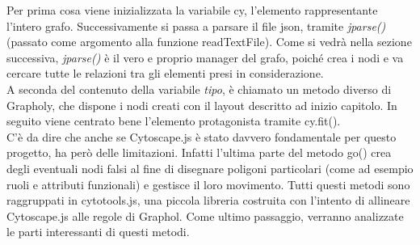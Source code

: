 \documentclass[Lau,binding=0.6cm]{sapthesis}
\begin{document}
Per prima cosa viene inizializzata la variabile cy, l'elemento rappresentante l'intero grafo. Successivamente si passa a parsare il file json, tramite \textit{jparse()} (passato come argomento alla funzione readTextFile). Come si vedrà nella sezione successiva, \textit{jparse()} è il vero e proprio manager del grafo, poiché crea i nodi e va cercare tutte le relazioni tra gli elementi presi in considerazione. 
\\A seconda del contenuto della variabile \textit{tipo}, è chiamato un metodo diverso di Grapholy, che dispone i nodi creati con il layout descritto ad inizio capitolo. In seguito viene centrato bene l'elemento protagonista tramite cy.fit().\\
C'è da dire che anche se Cytoscape.js è stato davvero fondamentale per questo progetto, ha però delle limitazioni. Infatti l'ultima parte del metodo go() crea degli eventuali nodi falsi al fine di disegnare poligoni particolari (come ad esempio ruoli e attributi funzionali) e gestisce il loro movimento. Tutti questi metodi sono raggruppati in cytotools.js, una piccola libreria costruita con l'intento di allineare Cytoscape.js alle regole di Graphol. Come ultimo passaggio, verranno analizzate le parti interessanti di questi metodi.
\end{document}
